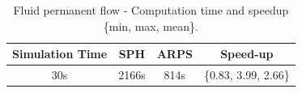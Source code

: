 \begin{table}[htb]
    \centering
\begin{tabular}{|c|c|c|c|} \hline
    Simulation Time & SPH       & ARPS    & Speed-up \\ \hline
    30s         & 2166s     & 814s              & \{0.83, 3.99, 2.66\} \\ \hline
\end{tabular}
\caption[ARPS: Fluid permanent flow - Measurements]{\label{table:perf2}Fluid permanent flow - Computation time and speedup \{min, max, mean\}.}
\end{table}
